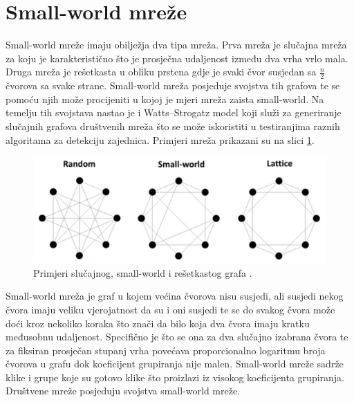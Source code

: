 \section{Small-world mreže} \label{small-world}

Small-world mreže imaju obilježja dva tipa mreža. Prva mreža je slučajna mreža za koju je karakteristično što je prosječna udaljenost između dva vrha vrlo mala. Druga mreža je rešetkasta u obliku prstena gdje je svaki čvor susjedan sa $\frac{n}{2}$ čvorova sa svake strane. Small-world mreža posjeduje svojstva tih grafova te se pomoću njih može procijeniti u kojoj je mjeri mreža zaista small-world. Na temelju tih svojstava nastao je i Watts–Strogatz model koji služi za generiranje slučajnih grafova društvenih mreža što se može iskoristiti u testiranjima raznih algoritama za detekciju zajednica. Primjeri mreža prikazani su na slici \ref{fig:small-world}.

\begin{figure}
	\includegraphics[width=\linewidth]{images/small-world.png}
	\caption{Primjeri slučajnog, small-world i rešetkastog grafa \cite{article_2015}.}
	\label{fig:small-world}
\end{figure}

Small-world mreža je graf u kojem većina čvorova nisu susjedi, ali susjedi nekog čvora imaju veliku vjerojatnost da su i oni susjedi te se do svakog čvora može doći kroz nekoliko koraka što znači da bilo koja dva čvora imaju kratku međusobnu udaljenost. Specifično je što se ona za dva slučajno izabrana čvora te za fiksiran prosječan stupanj vrha povećava proporcionalno logaritmu broja čvorova u grafu dok koeficijent grupiranja nije malen. Small-world mreže sadrže klike i grupe koje su gotovo klike što proizlazi iz visokog koeficijenta grupiranja. Društvene mreže posjeduju svojstva small-world mreže.

